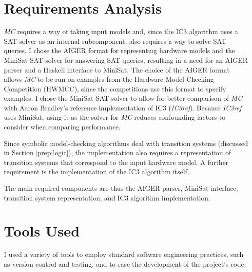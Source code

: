 \documentclass[12pt,a4paper,twoside,openright]{report}
\begin{document}
\section{Requirements Analysis}
\label{prep:requirements}


\emph{MC} requires a way of taking input models and, since
the IC3 algorithm uses a SAT solver as an internal subcomponent, also
requires a way to solve SAT queries.
I chose the AIGER format for representing hardware models and the
MiniSat SAT solver for answering SAT queries, resulting in a need for an
AIGER parser and a Haskell interface to MiniSat. The choice of
the AIGER format allows \emph{MC} to be run on examples from
the Hardware Model Checking Competition (HWMCC), since the competitions
use this format to specify examples. I chose the MiniSat SAT
solver to allow for better comparison of \emph{MC}
with Aaron Bradley's reference implementation of IC3 (\emph{IC3ref})\cite{refic3}.
Because \emph{IC3ref} uses MiniSat, using it as the solver
for \emph{MC} reduces confounding factors to consider when comparing performance.

Since symbolic model-checking algorithms deal with transition systems
(discussed in Section \ref{prep:logic}), the implementation also requires a representation of
transition systems that correspond to the input hardware model.
A further requirement is the implementation of the
IC3 algorithm itself.

The main required components are thus the AIGER parser, MiniSat interface,
transition system representation, and IC3 algorithm implementation.

\section{Tools Used}
\label{prep:tools}

I used a variety of tools to employ standard software engineering practices, such
as version control and testing, and to ease the development of
the project's code.
\end{document}
